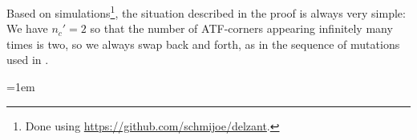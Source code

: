 \documentclass[12pt,a4paper,abstract=true,final]{scrartcl}
\begin{document}
\begin{remark}
    Based on simulations\footnote{Done using \url{https://github.com/schmijoe/delzant}.}, the situation described in the proof is always very simple: 
    We have $n_c'=2$ so that the number of ATF-corners appearing infinitely many times is two, so we always swap back and forth, as in the sequence of mutations used in \cite{EvaUrz21}.
\end{remark}

\emergencystretch=1em
\printbibliography
\end{document}
